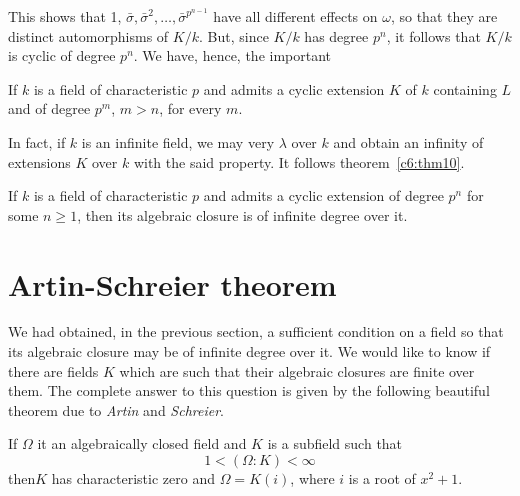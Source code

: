 This shows that 1, $\bar{\sigma}, \bar{\sigma}^2,\ldots ,
\bar{\sigma}^{p^{n-1}}$ have all different effects on $\omega$, so
that they are distinct automorphisms of $K/k$. But, since $K/k$ has
degree $p^n$, it follows that $K/k$ is cyclic of degree $p^n$. We
have, hence, the important 

\begin{thm}\label{c6:thm11} %
 If $k$ is a field of characteristic $p$ and admits a cyclic extension
 $K$ of $k$ containing $L$ and of degree $p^m$, $m>n$, for every $m$. 
\end{thm}

In fact, if $k$ is an infinite field, we may very $\lambda$ over $k$
and obtain an infinity of extensions $K$ over $k$ with the said
property. It follows theorem~\ref{c6:thm10}. 

\begin{coro*} %
If $k$ is a field of characteristic $p$ and admits a cyclic
  extension of degree $p^n$ for some $n \geq 1$, then its algebraic
  closure is of infinite degree over it. 
\end{coro*}

\section{Artin-Schreier theorem}\label{c6:s5}%

We had obtained, in the previous section, a sufficient condition on a
field so that its algebraic closure may be of infinite degree over
it. We would like to know if there are fields $K$ which are such that
their algebraic closures are finite over them. The complete answer to
this question is given by the following beautiful theorem due to
\textit{Artin} and \textit{Schreier}. 

\begin{thm}\label{c6:thm12} %
If $\Omega$ it an algebraically closed field and $K$ is a
  subfield such that 
$$
1 < (\Omega : K) < \infty
$$
then\pageoriginale $K$ has characteristic zero and $\Omega = K(i)$,
where $i$ is a root of $x^2+1$.  
\end{thm}

